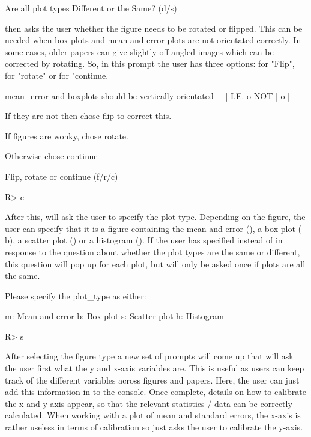 \documentclass[article]{jss}
\newcommand{\fct}[1]{\code{#1()}}
\begin{document}
\begin{CodeChunk}
\begin{CodeOutput}
Are all plot types Different or the Same? (d/s)
\end{CodeOutput}
\end{CodeChunk}

\fct{metaDigitise} then asks the user whether the figure needs to be rotated or flipped. This can be needed when box plots and mean and error plots are not orientated correctly. In some cases, older papers can give slightly off angled images which can be corrected by rotating. So, in this prompt the user has three options:  for "Flip",  for "rotate" or  for "continue. 

\begin{CodeChunk}
\begin{CodeOutput}
mean_error and boxplots should be vertically orientated
       _ 
       |  
  I.E. o    NOT  |-o-|
       |
       _

If they are not then chose flip to correct this.

If figures are wonky, chose rotate.

Otherwise chose continue

Flip, rotate or continue (f/r/c) 
\end{CodeOutput}
\begin{CodeInput}
R> c
\end{CodeInput}
\end{CodeChunk}

After this, \fct{metaDigitise} will ask the user to specify the plot type. Depending on the figure, the user can specify that it is a figure containing the mean and error (), a box plot (\code
{b}), a scatter plot () or a histogram (). If the user has specified  instead of  in response to the question about whether the plot types are the same or different, this question will pop up for each plot, but will only be asked once if plots are all the same.

\begin{CodeChunk}
\begin{CodeOutput}
Please specify the plot_type as either:

 m: Mean and error
 b: Box plot
 s: Scatter plot 
 h: Histogram

 R> s
\end{CodeOutput}
\end{CodeChunk}

After selecting the figure type a new set of prompts will come up that will ask the user first what the y and x-axis variables are. This is useful as users can keep track of the different variables across figures and papers. Here, the user can just add this information in to the  console. Once complete, details on how to calibrate the x and y-axis appear, so that the relevant statistics / data can be correctly calculated. When working with a plot of mean and standard errors, the x-axis is rather useless in terms of calibration so  just asks the user to calibrate the y-axis. 
\end{document}
